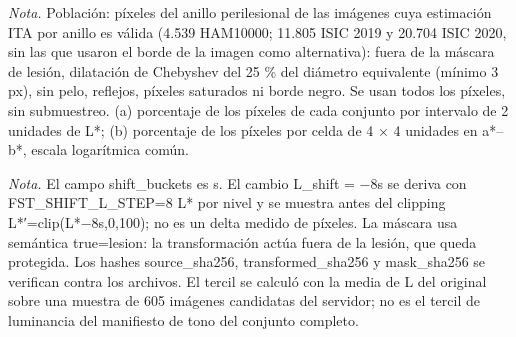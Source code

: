 \caption{Distribución CIELAB de los píxeles del anillo perilesional en HAM10000, ISIC 2019 e ISIC 2020.}
\textit{Nota.} Población: píxeles del anillo perilesional de las imágenes cuya estimación ITA por anillo es válida (4.539 HAM10000; 11.805 ISIC 2019 y 20.704 ISIC 2020, sin las que usaron el borde de la imagen como alternativa): fuera de la máscara de lesión, dilatación de Chebyshev del 25 \% del diámetro equivalente (mínimo 3 px), sin pelo, reflejos, píxeles saturados ni borde negro. Se usan todos los píxeles, sin submuestreo. (a) porcentaje de los píxeles de cada conjunto por intervalo de 2 unidades de L*; (b) porcentaje de los píxeles por celda de 4 × 4 unidades en a*–b*, escala logarítmica común.

\caption{Pares original/transformada CIRCLe con la misma máscara de lesión y el tercil de luminancia registrado.}
\textit{Nota.} El campo shift\_buckets es s. El cambio L\_shift = −8s se deriva con FST\_SHIFT\_L\_STEP=8 L* por nivel y se muestra antes del clipping L*′=clip(L*−8s,0,100); no es un delta medido de píxeles. La máscara usa semántica true=lesion: la transformación actúa fuera de la lesión, que queda protegida. Los hashes source\_sha256, transformed\_sha256 y mask\_sha256 se verifican contra los archivos. El tercil se calculó con la media de L del original sobre una muestra de 605 imágenes candidatas del servidor; no es el tercil de luminancia del manifiesto de tono del conjunto completo.

